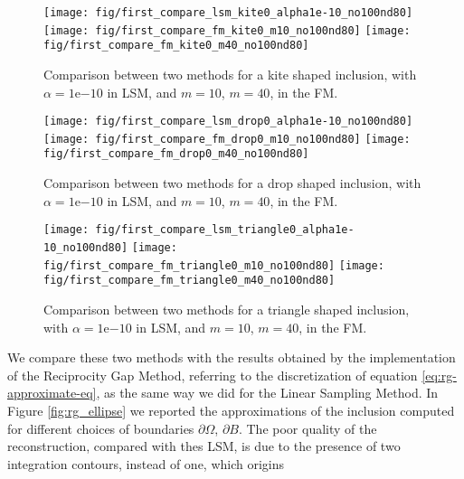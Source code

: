 \documentclass[10pt, a4paper, twoside, openright]{book}
\theoremstyle{definition}
\theoremstyle{plain}
\theoremstyle{plain}
\theoremstyle{plain}
\theoremstyle{plain}
\theoremstyle{plain}
\theoremstyle{plain}
\theoremstyle{plain}
\theoremstyle{plain}
\begin{document}
% 
\begin{center}
\begin{figure}%
{
\texttt{[image: fig/first\_compare\_lsm\_kite0\_alpha1e-10\_no100nd80]}
}
{
\texttt{[image: fig/first\_compare\_fm\_kite0\_m10\_no100nd80]}
}
{
\texttt{[image: fig/first\_compare\_fm\_kite0\_m40\_no100nd80]}
}
\caption{Comparison between two methods for a kite shaped inclusion, with $\alpha=\mathrm{1e}{-10}$ 
in LSM, and $m=10$, $m=40$, in the FM.}
\label{fig:first_compare_kite}
\end{figure}
\end{center}
\begin{center}
\begin{figure}[]
{
\texttt{[image: fig/first\_compare\_lsm\_drop0\_alpha1e-10\_no100nd80]}
}
{
\texttt{[image: fig/first\_compare\_fm\_drop0\_m10\_no100nd80]}
}
{
\texttt{[image: fig/first\_compare\_fm\_drop0\_m40\_no100nd80]}
}
\caption{Comparison between two methods for a drop shaped inclusion, with $\alpha=\mathrm{1e}{-10}$ 
in LSM, and $m=10$, $m=40$, in the FM.}
\label{fig:first_compare_drop}
\end{figure}
\end{center}
\begin{center}
\begin{figure}[]
{
\texttt{[image: fig/first\_compare\_lsm\_triangle0\_alpha1e-10\_no100nd80]}
}
{
\texttt{[image: fig/first\_compare\_fm\_triangle0\_m10\_no100nd80]}
}
{
\texttt{[image: fig/first\_compare\_fm\_triangle0\_m40\_no100nd80]}
}
\caption{Comparison between two methods for a triangle shaped inclusion, with $\alpha=\mathrm{1e}{-10}$ 
in LSM, and $m=10$, $m=40$, in the FM.}
\label{fig:first_compare_triangle}
\end{figure}
\end{center}
We compare these two methods with the results obtained by the implementation
of the Reciprocity Gap Method, referring to the discretization of equation 
\eqref{eq:rg-approximate-eq}, as the same way we did for the Linear Sampling Method.
In Figure \ref{fig:rg_ellipse} we reported the approximations of the inclusion
computed for different choices of boundaries $\partial \Omega$, $\partial B$.
The poor quality of the reconstruction, compared with thes LSM, is 
due to the presence of two integration contours, instead of one, which origins
\end{document}
